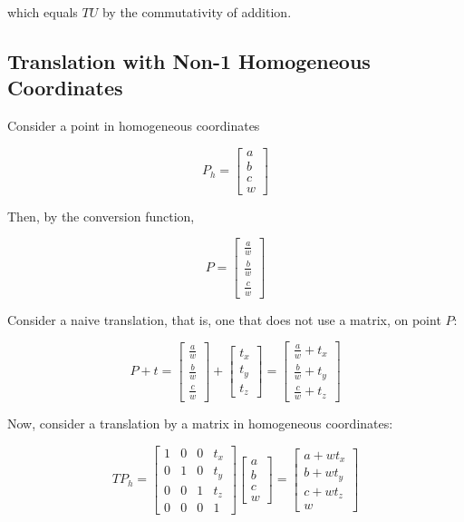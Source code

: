 \documentclass{article}
\begin{document}
which equals $ T U $ by the commutativity of addition.

\subsection{Translation with Non-1 Homogeneous Coordinates}

Consider a point in homogeneous coordinates 

$$
P_h = \begin{bmatrix}
a \\
b \\
c \\
w
\end{bmatrix}
$$

Then, by the conversion function,

$$
P = \begin{bmatrix}
\frac{a}{w} \\
\frac{b}{w} \\
\frac{c}{w}
\end{bmatrix}
$$

Consider a naive translation, that is, one that does not use a matrix, on point 
$P$:

$$
P + t = \begin{bmatrix}
\frac{a}{w} \\
\frac{b}{w} \\
\frac{c}{w}
\end{bmatrix} + \begin{bmatrix}
t_x \\
t_y \\
t_z
\end{bmatrix} = \begin{bmatrix}
\frac{a}{w} + t_x \\
\frac{b}{w} + t_y\\
\frac{c}{w} + t_z
\end{bmatrix}
$$

Now, consider a translation by a matrix in homogeneous coordinates:

$$
T P_h = \begin{bmatrix}
1 & 0 & 0 & t_x \\
0 & 1 & 0 & t_y \\
0 & 0 & 1 & t_z \\
0 & 0 & 0 & 1
\end{bmatrix} \begin{bmatrix}
a \\
b \\
c \\
w
\end{bmatrix} = \begin{bmatrix}
a + w t_x \\
b + w t_y \\
c + w t_z \\
w
\end{bmatrix}
$$
\end{document}
